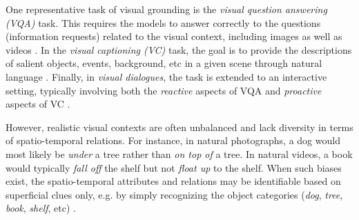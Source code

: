 One representative task of visual grounding is the \textit{visual question answering (VQA)} task. This requires the models to answer correctly to the questions (information requests) related to the visual context, including images \citep{antol2015vqa,hudson2019gqa} as well as videos \citep{lei-etal-2018-tvqa,lei-etal-2020-tvqa}. In the \textit{visual captioning (VC)} task, the goal is to provide the descriptions of salient objects, events, background, etc in a given scene through natural language \citep{xu2015show,hossain2019comprehensive}. Finally, in \textit{visual dialogues}, the task is extended to an interactive setting, typically involving both the \textit{reactive} aspects of VQA and \textit{proactive} aspects of VC \citep{das2017visual,de2017guesswhat,alamri2019audio}.

However, realistic visual contexts are often unbalanced and lack diversity in terms of spatio-temporal relations. For instance, in natural photographs, a dog would most likely be \textit{under} a tree rather than \textit{on top of} a tree. In natural videos, a book would typically \textit{fall off} the shelf but not \textit{float up} to the shelf. When such biases exist, the spatio-temporal attributes and relations may be identifiable based on superficial clues only, e.g. by simply recognizing the object categories (\textit{dog}, \textit{tree}, \textit{book}, \textit{shelf}, etc) \citep{goyal2017making,cirik-etal-2018-visual}.


